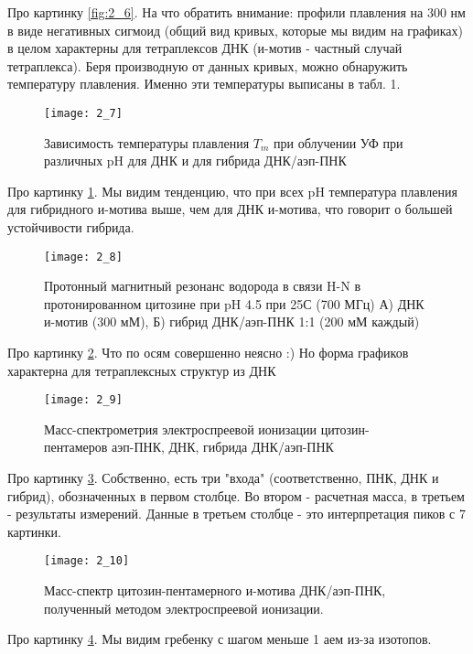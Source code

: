 Про картинку \ref{fig:2_6}. На что обратить внимание: профили плавления на 300 нм в виде негативных сигмоид (общий вид кривых, которые мы видим на графиках) в целом характерны для тетраплексов ДНК (и-мотив - частный случай тетраплекса). Беря производную от данных кривых, можно обнаружить температуру плавления. Именно эти температуры выписаны в табл. 1.

\begin{figure}[H]
	\centering
	\texttt{[image: 2\_7]}
	\caption{Зависимость температуры плавления $T_m$ при облучении УФ  при различных pH для ДНК и для гибрида ДНК/аэп-ПНК}
	\label{fig:2_7}
\end{figure}

Про картинку \ref{fig:2_7}. Мы видим тенденцию, что при всех pH температура плавления для гибридного и-мотива выше, чем для ДНК и-мотива, что говорит о большей устойчивости гибрида.

\begin{figure}[H]
	\centering
	\texttt{[image: 2\_8]}
	\caption{Протонный магнитный резонанс водорода в связи H-N в протонированном цитозине при pH 4.5 при 25С (700 МГц) А) ДНК и-мотив (300 мМ), Б) гибрид ДНК/аэп-ПНК 1:1 (200 мМ каждый)}
	\label{fig:2_8}
\end{figure}

Про картинку \ref{fig:2_8}. Что по осям совершенно неясно :) Но форма графиков характерна для тетраплексных структур из ДНК

\begin{figure}[H]
	\centering
	\texttt{[image: 2\_9]}
	\caption{Масс-спектрометрия электроспреевой ионизации цитозин-пентамеров аэп-ПНК, ДНК, гибрида ДНК/аэп-ПНК}
	\label{fig:2_9}
\end{figure}

Про картинку \ref{fig:2_9}. Собственно, есть три "входа" (соответственно, ПНК, ДНК и гибрид), обозначенных в первом столбце. Во втором - расчетная масса, в третьем - результаты измерений. Данные в третьем столбце - это интерпретация пиков с 7 картинки.

\begin{figure}[H]
	\centering
	\texttt{[image: 2\_10]}
	\caption{Масс-спектр цитозин-пентамерного и-мотива ДНК/аэп-ПНК, полученный методом электроспреевой ионизации.}
	\label{fig:2_10}
\end{figure}

Про картинку \ref{fig:2_10}. Мы видим гребенку с шагом меньше 1 аем из-за изотопов.
